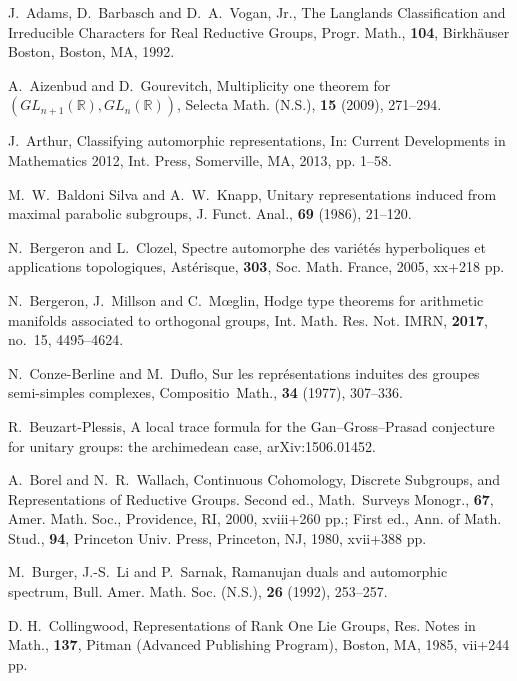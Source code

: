 \bigskip

\begin{thebibliography}{M}

J.~Adams, D.~Barbasch and D.~A.~Vogan, Jr.,
The Langlands Classification and Irreducible Characters for Real Reductive Groups,
Progr. Math., {\bf{104}}, Birkh\"{a}user Boston, Boston, MA, 1992.

A.~Aizenbud and D.~Gourevitch,
Multiplicity one theorem for $(GL_{n+1}({\mathbb{R}}), GL_n({\mathbb{R}}))$,
Selecta Math. (N.S.), {\bf{15}} (2009), 271--294.

J.~Arthur,
Classifying automorphic representations,
In: Current Developments in Mathematics 2012,
Int. Press, Somerville, MA, 2013, pp. 1--58.

M.~W.~Baldoni Silva and A.~W.~Knapp,
Unitary representations induced from maximal parabolic subgroups,
J. Funct. Anal., {\bf{69}} (1986), 21--120.

N.~Bergeron and L.~Clozel,
Spectre automorphe des vari{\'e}t{\'e}s hyperboliques et applications topologiques,
Ast{\'e}risque, {\bf{303}}, Soc. Math. France, 2005, xx+218 pp.

N.~Bergeron, J.~Millson and C.~M{\oe}glin,
Hodge type theorems for arithmetic manifolds associated to orthogonal groups,
Int. Math. Res. Not. IMRN, {\bf 2017}, no.~{15}, 4495--4624.

N.~Conze-Berline and M.~Duflo,
Sur les repr{\'e}sentations induites des groupes semi-simples complexes,
Compositio~Math., {\bf{34}} (1977), 307--336.

R.~Beuzart-Plessis,
A local trace formula for the Gan--Gross--Prasad conjecture for unitary groups: the archimedean case,
arXiv:1506.01452.

A.~Borel and N.~R.~Wallach,
Continuous Cohomology, Discrete Subgroups, and Representations of Reductive Groups.
Second ed., Math.~Surveys Monogr., {\bf{67}}, Amer. Math. Soc., Providence, RI,
2000, xviii+260 pp.;
First ed., Ann. of Math. Stud., {\bf{94}}, Princeton Univ. Press, Princeton, NJ,
1980, xvii+388 pp.

M.~Burger, J.-S.~Li and P.~Sarnak,
Ramanujan duals and automorphic spectrum,
Bull. Amer. Math. Soc. (N.S.), {\bf{26}} (1992), 253--257.

D. H.~Collingwood,
Representations of Rank One Lie Groups,
Res. Notes in Math., {\bf{137}}, 
Pitman (Advanced Publishing Program), Boston, MA, 1985, vii+244 pp.


\end{thebibliography}
